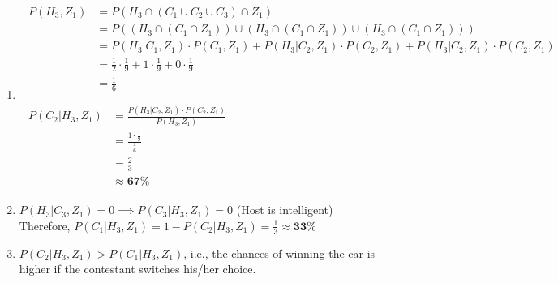 \documentclass[11pt]{article}
\begin{document}
\begin{enumerate}[label=(\alph*)]
    \item
          \begin{align*}
              \begin{split}
                  P(H_3, Z_1) &= P(H_3 \cap (C_1 \cup C_2 \cup C_3) \cap Z_1) \\
                  &= P((H_3 \cap (C_1 \cap Z_1)) \cup (H_3 \cap (C_1 \cap Z_1)) \cup (H_3 \cap (C_1 \cap Z_1))) \\
                  &= P(H_3|C_1,Z_1) \cdot P(C_1,Z_1) + P(H_3|C_2,Z_1) \cdot P(C_2,Z_1) + P(H_3|C_2,Z_1) \cdot P(C_2,Z_1) \\
                  &= \frac{1}{2} \cdot \frac{1}{9} + 1 \cdot \frac{1}{9} + 0 \cdot \frac{1}{9} \\
                  &= \frac{1}{6}
              \end{split} \\\\
              \begin{split}
                  P(C_2|H_3, Z_1) &= \frac{P(H_3|C_2, Z_1) \cdot P(C_2, Z_1)}{P(H_3, Z_1)} \\
                  &= \frac{1 \cdot \frac{1}{9}}{\frac{1}{6}} \\
                  &= \frac{2}{3} \\
                  &\approx \mathbf{67\%}
              \end{split}
          \end{align*}

    \item
          $P(H_3|C_3,Z_1) = 0 \implies P(C_3|H_3, Z_1)=0$ \hspace{1em} (Host is intelligent)\\
          Therefore, $P(C_1|H_3, Z_1) = 1 - P(C_2|H_3, Z_1) = \frac{1}{3} \approx \mathbf{33\%}$

    \item
          $P(C_2|H_3, Z_1) > P(C_1|H_3, Z_1)$, i.e., the chances of winning the car is higher if the contestant switches his/her choice.


\end{enumerate}
\end{document}
